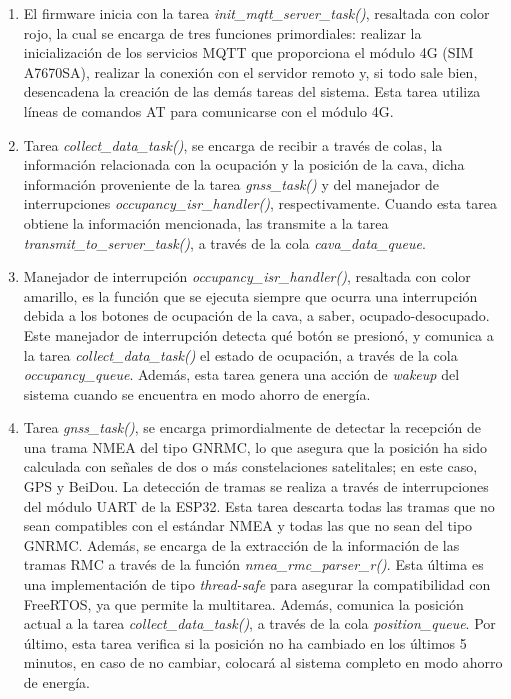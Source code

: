 \begin{enumerate}
	\item El firmware inicia con la tarea \textit{init\_mqtt\_server\_task()}, resaltada con color rojo, la cual se encarga de tres funciones primordiales: realizar la inicialización de los servicios MQTT que proporciona el módulo 4G (SIM A7670SA), realizar la conexión con el servidor remoto y, si todo sale bien, desencadena la creación de las demás tareas del sistema. Esta tarea utiliza líneas de comandos AT para comunicarse con el módulo 4G.
	
	\item Tarea \textit{collect\_data\_task()}, se encarga de recibir a través de colas, la información relacionada con la ocupación y la posición de la cava, dicha información proveniente de la tarea \textit{gnss\_task()} y del manejador de interrupciones \textit{occupancy\_isr\_handler()}, respectivamente. Cuando esta tarea obtiene la información mencionada, las transmite a la tarea \textit{transmit\_to\_server\_task()}, a través de la cola \textit{cava\_data\_queue}.
	
	\item Manejador de interrupción \textit{occupancy\_isr\_handler()}, resaltada con color amarillo, es la función que se ejecuta siempre que ocurra una interrupción debida a los botones de ocupación de la cava, a saber, ocupado-desocupado. Este manejador de interrupción detecta qué botón se presionó, y comunica a la tarea \textit{collect\_data\_task()} el estado de ocupación, a través de la cola \textit{occupancy\_queue}. Además, esta tarea genera una acción de \textit{wakeup} del sistema cuando se encuentra en modo ahorro de energía. 	
	
	\item Tarea \textit{gnss\_task()}, se encarga primordialmente de detectar la recepción de una trama NMEA del tipo GNRMC, lo que asegura que la posición ha sido calculada con señales de dos o más constelaciones satelitales; en este caso, GPS y BeiDou. La detección de tramas se realiza a través de interrupciones del módulo UART de la ESP32. Esta tarea descarta todas las tramas que no sean compatibles con el estándar NMEA y todas las que no sean del tipo GNRMC. Además, se encarga de la extracción de la información de las tramas RMC a través de la función \textit{nmea\_rmc\_parser\_r()}. Esta última es una implementación de tipo \textit{thread-safe} para asegurar la compatibilidad con FreeRTOS, ya que permite la multitarea. Además, comunica la posición actual a la tarea \textit{collect\_data\_task()}, a través de la cola \textit{position\_queue}. Por último, esta tarea verifica si la posición no ha cambiado en los últimos 5 minutos, en caso de no cambiar, colocará al sistema completo en modo ahorro de energía. 
		

\end{enumerate}
